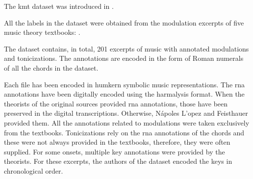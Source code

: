 
The \gls{kmt} dataset was introduced in
\textcite{napoleslopez2020local}.

All the labels in the dataset were obtained from the
modulation excerpts of five music theory textbooks:
\textcite{aldwell2019harmony, kostka2008tonal,
reger1904supplement, rimskikorsakov1886practical,
tchaikovsky1872guide}.

The dataset contains, in total, 201 excerpts of music with
annotated modulations and tonicizations. The annotations are
encoded in the form of Roman numerals of all the chords in
the dataset. 

Each file has been encoded in \gls{humkern} symbolic music
representations. The \gls{rna} annotations have been
digitally encoded using the \gls{harmalysis} format. When
the theorists of the original sources provided \gls{rna}
annotations, those have been preserved in the digital
transcriptions. Otherwise, N\'apoles L'opez and Feisthauer
provided them. All the annotations related to modulations
were taken exclusively from the textbooks. Tonicizations
rely on the \gls{rna} annotations of the chords and these
were not always provided in the textbooks, therefore, they
were often supplied. For some onsets, multiple key
annotations were provided by the theorists. For these
excerpts, the authors of the dataset encoded the keys in
chronological order.
